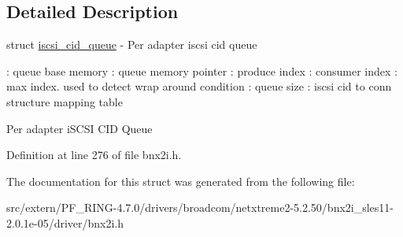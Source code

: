 \subsection{Detailed Description}
struct \hyperlink{structiscsi__cid__queue}{iscsi\_\-cid\_\-queue} -\/ Per adapter iscsi cid queue

: queue base memory : queue memory pointer : produce index : consumer index : max index. used to detect wrap around condition : queue size : iscsi cid to conn structure mapping table

Per adapter iSCSI CID Queue 

Definition at line 276 of file bnx2i.h.



The documentation for this struct was generated from the following file:\begin{DoxyCompactItemize}
\item 
src/extern/PF\_\-RING-\/4.7.0/drivers/broadcom/netxtreme2-\/5.2.50/bnx2i\_\-sles11-\/2.0.1e-\/05/driver/bnx2i.h\end{DoxyCompactItemize}
